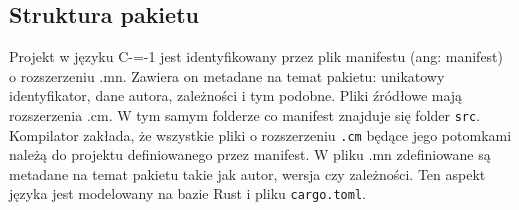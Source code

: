 \subsection{Struktura pakietu}\label{struktura_paczki}
Projekt w języku C-=-1 jest identyfikowany przez plik manifestu (ang: manifest) o rozszerzeniu .mn. 
Zawiera on metadane na temat pakietu: unikatowy identyfikator, dane autora, zależności i tym podobne.
Pliki źródłowe mają rozszerzenia .cm. W tym samym folderze co manifest znajduje się folder \lstinline{src}. Kompilator zakłada, że wszystkie pliki o rozszerzeniu \lstinline{.cm} będące jego potomkami należą do projektu definiowanego przez manifest.
W pliku .mn zdefiniowane są metadane na temat pakietu takie jak autor, wersja czy zależności. Ten aspekt języka jest modelowany na bazie Rust i pliku \lstinline{cargo.toml}.
